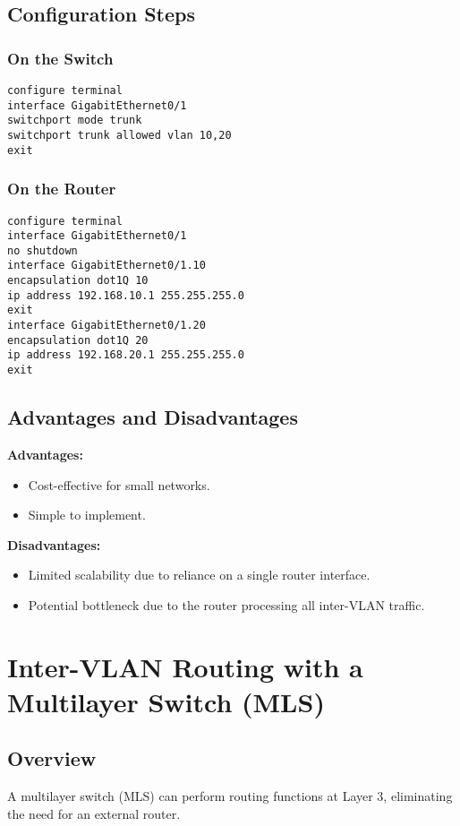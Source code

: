 \documentclass[a4paper]{book}
\begin{document}
\subsection{Configuration Steps}
\subsubsection{On the Switch}
\begin{lstlisting}
configure terminal
interface GigabitEthernet0/1
switchport mode trunk
switchport trunk allowed vlan 10,20
exit
\end{lstlisting}

\subsubsection{On the Router}
\begin{lstlisting}
configure terminal
interface GigabitEthernet0/1
no shutdown
interface GigabitEthernet0/1.10
encapsulation dot1Q 10
ip address 192.168.10.1 255.255.255.0
exit
interface GigabitEthernet0/1.20
encapsulation dot1Q 20
ip address 192.168.20.1 255.255.255.0
exit
\end{lstlisting}

\subsection{Advantages and Disadvantages}
\textbf{Advantages:}
\begin{itemize}
    \item Cost-effective for small networks.
    \item Simple to implement.
\end{itemize}

\textbf{Disadvantages:}
\begin{itemize}
    \item Limited scalability due to reliance on a single router interface.
    \item Potential bottleneck due to the router processing all inter-VLAN traffic.
\end{itemize}

\section{Inter-VLAN Routing with a Multilayer Switch (MLS)}
\subsection{Overview}
A multilayer switch (MLS) can perform routing functions at Layer 3, eliminating the need for an external router.
\end{document}
